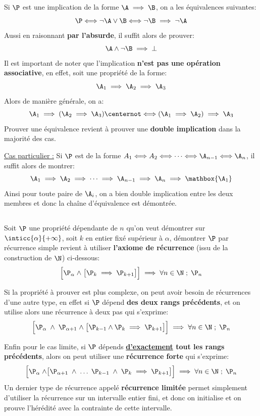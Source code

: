 \subsection*{}
Si \(\P\) est une implication de la forme \(\A \implies \B\), on a les équivalences suivantes:
\[
   \P \Longleftrightarrow \lnot \A \lor \B \Longleftrightarrow \lnot \B \implies \lnot \A
\]
Aussi en raisonnant \textbf{par l'absurde}, il suffit alors de prouver:
\[
   \A \land \lnot \B \implies \bot 
\]
Il est important de noter que l'implication \textbf{n'est pas une opération associative}, en effet, soit une propriété de la forme:
\[
   \A_1 \implies \A_2 \implies \A_3
\]
Alors de manière générale, on a:
\[
   \A_1 \implies (\A_2 \implies \A_3) \centernot\Longleftrightarrow (\A_1 \implies \A_2) \implies \A_3
\]
Prouver une équivalence revient à prouver une \textbf{double implication} dans la majorité des cas.\<

\underline{Cas particulier {:}}
Si \(\P\) est de la forme \( A_1 \Longleftrightarrow A_2 \Longleftrightarrow \cdots \Longleftrightarrow \A_{n-1} \Longleftrightarrow \A_n \), il suffit alors de montrer:
\[
   \A_1 \implies \A_2 \implies \cdots \implies \A_{n-1} \implies \A_n \implies \mathbox{\A_1}
\]
Ainsi pour toute paire de \(\A_i\), on a bien double implication entre les deux membres et donc la chaîne d'équivalence est démontrée.
\subsection*{}
Soit \(\P\) une propriété dépendante de \(n\) qu'on veut démontrer sur \(\inticc{\alpha}{+\infty}\), soit \(k\) en entier fixé supérieur à \(\alpha\), démontrer \(\P\) par récurrence simple revient à utiliser \textbf{l'axiome de récurrence} (issu de la construction de \(\N\)) ci-dessous:
\[
   \Bigr[ \P_{\alpha} \; \land \; \bigr[ \P_{k} \implies \P_{k+1} \bigr] \Bigr] \implies \forall n \in \N \; ; \; \P_n   
\]

Si la propriété à prouver est plus complexe, on peut avoir besoin de récurrences d'une autre type, en effet si \(\P\) dépend \textbf{des deux rangs précédents}, et on utilise alors une récurrence à deux pas qui s'exprime:
\[
   \Bigr[ \P_{\alpha} \; \land \; \P_{\alpha + 1} \; \land \; \bigr[ \P_{k-1}  \land \P_{k}\implies \P_{k+1} \bigr] \Bigr] \implies \forall n \in \N \; ; \; \P_n   
\]

Enfin pour le cas limite, si \(\P\) dépends \textbf{\underline{d'exactement} tout les rangs précédents}, alors on peut utiliser une \textbf{récurrence forte} qui s'exprime:
\[
   \Bigr[ \P_{\alpha} \; \land \bigr[ \P_{\alpha + 1} \; \land \; \ldots \; \P_{k-1} \; \land \; \P_{k} \implies \P_{k+1}  \bigr] \Bigr] \implies \forall n \in \N \; ; \; \P_n   
\]
Un dernier type de récurrence appelé \textbf{récurrence limitée} permet simplement d'utiliser la récurrence sur un intervalle entier fini, et donc on initialise et on prouve l'hérédité avec la contrainte de cette intervalle.\<


